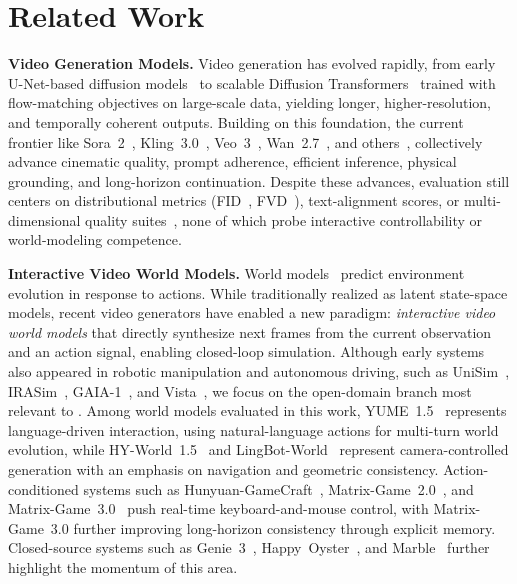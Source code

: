 \section{Related Work}
\label{sec:related_work}

\textbf{Video Generation Models.}
Video generation has evolved rapidly, from early U-Net-based diffusion models~\cite{ho2020denoising,ho2022video,blattmann2023align} to scalable Diffusion Transformers~\cite{yang2024cogvideox,polyak2024moviegen,kong2024hunyuanvideo} trained with flow-matching objectives on large-scale data, yielding longer, higher-resolution, and temporally coherent outputs.
Building on this foundation, the current frontier like Sora~2~\cite{openai2025sora2}, Kling~3.0~\cite{kuaishou2025kling3}, Veo~3~\cite{deepmind2025veo3}, Wan~2.7~\cite{wan2025wan27}, and others~\cite{gao2026seedance2,shengshu2025viduq3,kong2024hunyuanvideo,lightricks2025ltx,nvidia2025cosmos,cai2025longcat}, collectively advance cinematic quality, prompt adherence, efficient inference, physical grounding, and long-horizon continuation.
Despite these advances, evaluation still centers on distributional metrics (FID~\cite{heusel2017fid}, FVD~\cite{unterthiner2019fvd}), text-alignment scores, or multi-dimensional quality suites~\cite{huang2024vbench}, none of which probe interactive controllability or world-modeling competence.


\textbf{Interactive Video World Models.}
World models~\cite{ha2018world,lecun2022path} predict environment evolution in response to actions. While traditionally realized as latent state-space models, recent video generators have enabled a new paradigm: \emph{interactive video world models} that directly synthesize next frames from the current observation and an action signal, enabling closed-loop simulation. Although early systems also appeared in robotic manipulation and autonomous driving, such as UniSim~\cite{yang2023unisim}, IRASim~\cite{zhu2024irasim}, GAIA-1~\cite{hu2023gaia1}, and Vista~\cite{gao2024vista}, we focus on the open-domain branch most relevant to \benchmark.
Among world models evaluated in this work, YUME~1.5~\cite{mao2025yume15} represents language-driven interaction, using natural-language actions for multi-turn world evolution, while HY-World~1.5~\cite{sun2025hyworldplay} and LingBot-World~\cite{gao2026lingbot} represent camera-controlled generation with an emphasis on navigation and geometric consistency.
Action-conditioned systems such as Hunyuan-GameCraft~\cite{li2025hunyuangamecraft,tang2025interbench}, Matrix-Game~2.0~\cite{he2025matrixgame2}, and Matrix-Game~3.0~\cite{he2026matrixgame3} push real-time keyboard-and-mouse control, with Matrix-Game~3.0 further improving long-horizon consistency through explicit memory. Closed-source systems such as Genie~3~\cite{ball2025genie3}, Happy~Oyster~\cite{alibaba2026happyoyster}, and Marble~\cite{worldlabs2025marble} further highlight the momentum of this area.


